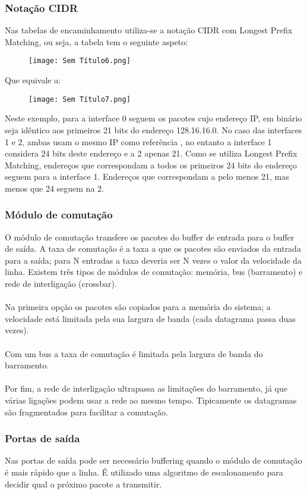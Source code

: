 \documentclass[10pt,a4paper]{report}
\begin{document}
\subsubsection{Notação CIDR}
Nas tabelas de encaminhamento utiliza-se a notação CIDR com Longest Prefix Matching, ou seja, a tabela tem o seguinte aspeto:\\
\begin{figure}[H]
\centering
\texttt{[image: Sem Título6.png]}
\end{figure}
Que equivale a:\\
\begin{figure}[H]
\centering
\texttt{[image: Sem Título7.png]}
\end{figure}
Neste exemplo, para a interface 0 seguem os pacotes cujo endereço IP, em binário seja idêntico aos primeiros 21 bits do endereço 128.16.16.0. No caso das interfaces 1 e 2, ambas usam o mesmo IP como referência , no entanto a interface 1 considera 24 bits deste endereço e a 2 apenas 21. Como se utiliza Longest Prefix Matching, endereços que correspondam a todos os primeiros 24 bits do endereço seguem para a interface 1. Endereços que correspondam a pelo menos 21, mas menos que 24 seguem na 2.
\subsubsection{Módulo de comutação}
O módulo de comutação transfere os pacotes do buffer de entrada para o buffer de saída. A taxa de comutação é a taxa a que os pacotes são enviados da entrada para a saída; para N entradas a taxa deveria ser N vezes o valor da velocidade da linha. Existem três tipos de módulos de comutação: memória, bus (barramento) e rede de interligação (crossbar).\\
\\
Na primeira opção os pacotes são copiados para a memória do sistema; a velocidade está limitada pela sua largura de banda (cada datagrama passa duas vezes).\\
\\
Com um bus a taxa de comutação é limitada pela largura de banda do barramento.\\
\\
Por fim, a rede de interligação ultrapassa as limitações do barramento, já que várias ligações podem usar a rede ao mesmo tempo. Tipicamente os datagramas são fragmentados para facilitar a comutação.
\subsubsection{Portas de saída}
Nas portas de saída pode ser necessário buffering quando o módulo de comutação é mais rápido que a linha. É utilizado uma algoritmo de escalonamento para decidir qual o próximo pacote a transmitir.
\end{document}

